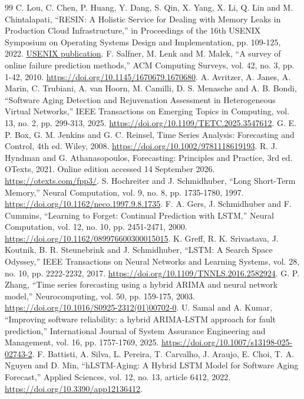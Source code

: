 \documentclass[10pt,a4paper,twocolumn]{article}
\begin{document}
\begin{thebibliography}{99}
 C. Lou, C. Chen, P. Huang, Y. Dang, S. Qin, X. Yang, X. Li, Q. Lin and M. Chintalapati, ``RESIN: A Holistic Service for Dealing with Memory Leaks in Production Cloud Infrastructure,'' in Proceedings of the 16th USENIX Symposium on Operating Systems Design and Implementation, pp. 109-125, 2022. \href{https://www.usenix.org/conference/osdi22/presentation/lou-resin}{USENIX publication}.
 F. Salfner, M. Lenk and M. Malek, ``A survey of online failure prediction methods,'' ACM Computing Surveys, vol. 42, no. 3, pp. 1-42, 2010. \url{https://doi.org/10.1145/1670679.1670680}.
 A. Avritzer, A. Janes, A. Marin, C. Trubiani, A. van Hoorn, M. Camilli, D. S. Menasche and A. B. Bondi, ``Software Aging Detection and Rejuvenation Assessment in Heterogeneous Virtual Networks,'' IEEE Transactions on Emerging Topics in Computing, vol. 13, no. 2, pp. 299-313, 2025. \url{https://doi.org/10.1109/TETC.2025.3547612}.
 G. E. P. Box, G. M. Jenkins and G. C. Reinsel, Time Series Analysis: Forecasting and Control, 4th ed. Wiley, 2008. \url{https://doi.org/10.1002/9781118619193}.
 R. J. Hyndman and G. Athanasopoulos, Forecasting: Principles and Practice, 3rd ed. OTexts, 2021. Online edition accessed 14 September 2026. \url{https://otexts.com/fpp3/}.
 S. Hochreiter and J. Schmidhuber, ``Long Short-Term Memory,'' Neural Computation, vol. 9, no. 8, pp. 1735-1780, 1997. \url{https://doi.org/10.1162/neco.1997.9.8.1735}.
 F. A. Gers, J. Schmidhuber and F. Cummins, ``Learning to Forget: Continual Prediction with LSTM,'' Neural Computation, vol. 12, no. 10, pp. 2451-2471, 2000. \url{https://doi.org/10.1162/089976600300015015}.
 K. Greff, R. K. Srivastava, J. Koutnik, B. R. Steunebrink and J. Schmidhuber, ``LSTM: A Search Space Odyssey,'' IEEE Transactions on Neural Networks and Learning Systems, vol. 28, no. 10, pp. 2222-2232, 2017. \url{https://doi.org/10.1109/TNNLS.2016.2582924}.
 G. P. Zhang, ``Time series forecasting using a hybrid ARIMA and neural network model,'' Neurocomputing, vol. 50, pp. 159-175, 2003. \url{https://doi.org/10.1016/S0925-2312(01)00702-0}.
 U. Samal and A. Kumar, ``Improving software reliability: a hybrid ARIMA-LSTM approach for fault prediction,'' International Journal of System Assurance Engineering and Management, vol. 16, pp. 1757-1769, 2025. \url{https://doi.org/10.1007/s13198-025-02743-2}.
 F. Battisti, A. Silva, L. Pereira, T. Carvalho, J. Araujo, E. Choi, T. A. Nguyen and D. Min, ``hLSTM-Aging: A Hybrid LSTM Model for Software Aging Forecast,'' Applied Sciences, vol. 12, no. 13, article 6412, 2022. \url{https://doi.org/10.3390/app12136412}.

\end{thebibliography}
\end{document}
